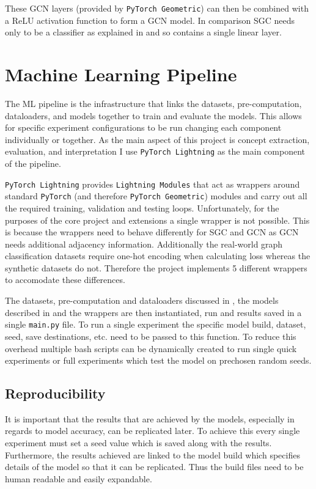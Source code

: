 These GCN layers (provided by \texttt{PyTorch Geometric}) can then be combined with a ReLU activation function to form a GCN model.
In comparison SGC needs only to be a classifier as explained in  and so contains a single linear layer.

\section{Machine Learning Pipeline}
\label{sec:pipeline}

The ML pipeline is the infrastructure that links the datasets, pre-computation, dataloaders, and models together to train and evaluate the models.
This allows for specific experiment configurations to be run changing each component individually or together.
As the main aspect of this project is concept extraction, evaluation, and interpretation I use \texttt{PyTorch Lightning} as the main component of the pipeline.

\texttt{PyTorch Lightning} provides \texttt{Lightning Modules} that act as wrappers around standard \texttt{PyTorch} (and therefore \texttt{PyTorch Geometric}) modules and carry out all the required training, validation and testing loops.
Unfortunately, for the purposes of the core project and extensions a single wrapper is not possible.
This is because the wrappers need to behave differently for SGC and GCN as GCN needs additional adjacency information.
Additionally the real-world graph classification datasets require one-hot encoding when calculating loss whereas the synthetic datasets do not.
Therefore the project implements 5 different wrappers to accomodate these differences.

The datasets, pre-computation and dataloaders discussed in , the models described in  and the wrappers are then instantiated, run and results saved in a single \texttt{main.py} file.
To run a single experiment the specific model build, dataset, seed, save destinations, etc. need to be passed to this function.
To reduce this overhead multiple bash scripts can be dynamically created to run single quick experiments or full experiments which test the model on prechosen random seeds.

\subsection{Reproducibility}
\label{sec:reproducibility}
It is important that the results that are achieved by the models, especially in regards to model accuracy, can be replicated later.
To achieve this every single experiment must set a seed value which is saved along with the results.
Furthermore, the results achieved are linked to the model build 
which specifies details of the model so that it can be replicated.
Thus the build files need to be human readable and easily expandable.

